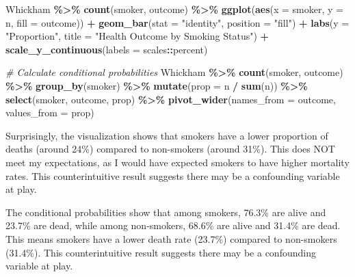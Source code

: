 \documentclass[
]{article}
\newenvironment{Shaded}{\begin{snugshade}}{\end{snugshade}}
\newcommand{\AttributeTok}[1]{\textcolor[rgb]{0.13,0.29,0.53}{#1}}
\newcommand{\CommentTok}[1]{\textcolor[rgb]{0.56,0.35,0.01}{\textit{#1}}}
\newcommand{\FunctionTok}[1]{\textcolor[rgb]{0.13,0.29,0.53}{\textbf{#1}}}
\newcommand{\NormalTok}[1]{#1}
\newcommand{\SpecialCharTok}[1]{\textcolor[rgb]{0.81,0.36,0.00}{\textbf{#1}}}
\newcommand{\StringTok}[1]{\textcolor[rgb]{0.31,0.60,0.02}{#1}}
\begin{document}
\begin{Shaded}
\begin{Highlighting}[]
\NormalTok{Whickham }\SpecialCharTok{\%\textgreater{}\%}
  \FunctionTok{count}\NormalTok{(smoker, outcome) }\SpecialCharTok{\%\textgreater{}\%}
  \FunctionTok{ggplot}\NormalTok{(}\FunctionTok{aes}\NormalTok{(}\AttributeTok{x =}\NormalTok{ smoker, }\AttributeTok{y =}\NormalTok{ n, }\AttributeTok{fill =}\NormalTok{ outcome)) }\SpecialCharTok{+}
  \FunctionTok{geom\_bar}\NormalTok{(}\AttributeTok{stat =} \StringTok{"identity"}\NormalTok{, }\AttributeTok{position =} \StringTok{"fill"}\NormalTok{) }\SpecialCharTok{+}
  \FunctionTok{labs}\NormalTok{(}\AttributeTok{y =} \StringTok{"Proportion"}\NormalTok{, }\AttributeTok{title =} \StringTok{"Health Outcome by Smoking Status"}\NormalTok{) }\SpecialCharTok{+}
  \FunctionTok{scale\_y\_continuous}\NormalTok{(}\AttributeTok{labels =}\NormalTok{ scales}\SpecialCharTok{::}\NormalTok{percent)}
\end{Highlighting}
\end{Shaded}

\begin{Shaded}
\begin{Highlighting}[]
\CommentTok{\# Calculate conditional probabilities}
\NormalTok{Whickham }\SpecialCharTok{\%\textgreater{}\%}
  \FunctionTok{count}\NormalTok{(smoker, outcome) }\SpecialCharTok{\%\textgreater{}\%}
  \FunctionTok{group\_by}\NormalTok{(smoker) }\SpecialCharTok{\%\textgreater{}\%}
  \FunctionTok{mutate}\NormalTok{(}\AttributeTok{prop =}\NormalTok{ n }\SpecialCharTok{/} \FunctionTok{sum}\NormalTok{(n)) }\SpecialCharTok{\%\textgreater{}\%}
  \FunctionTok{select}\NormalTok{(smoker, outcome, prop) }\SpecialCharTok{\%\textgreater{}\%}
    \FunctionTok{pivot\_wider}\NormalTok{(}\AttributeTok{names\_from =}\NormalTok{ outcome, }\AttributeTok{values\_from =}\NormalTok{ prop)}
\end{Highlighting}
\end{Shaded}

Surprisingly, the visualization shows that smokers have a lower
proportion of deaths (around 24\%) compared to non-smokers (around
31\%). This does NOT meet my expectations, as I would have expected
smokers to have higher mortality rates. This counterintuitive result
suggests there may be a confounding variable at play.

The conditional probabilities show that among smokers, 76.3\% are alive
and 23.7\% are dead, while among non-smokers, 68.6\% are alive and
31.4\% are dead. This means smokers have a lower death rate (23.7\%)
compared to non-smokers (31.4\%). This counterintuitive result suggests
there may be a confounding variable at play.
\end{document}
